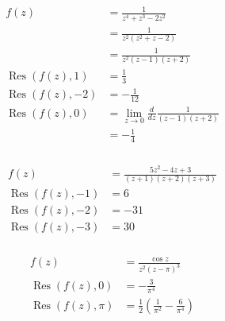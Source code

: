\documentclass{article}
\newcommand{\Res}{\operatorname{Res}}
\begin{document}
\setcounter{subsubsection}{8}
\subsubsection{}

\begin{align*}
  f(z)           & = \frac{1}{z^4 + z^3 - 2 z^2}                                    \\
                 & = \frac{1}{z^2 (z^2 + z - 2)}                                    \\
                 & = \frac{1}{z^2 (z - 1) (z + 2)}                                  \\
  \Res(f(z), 1)  & = \frac{1}{3}                                                    \\
  \Res(f(z), -2) & = -\frac{1}{12}                                                  \\
  \Res(f(z), 0)  & = \lim_{z \rightarrow 0} \frac{d}{d z} \frac{1}{(z - 1) (z + 2)} \\
                 & = -\frac{1}{4}
\end{align*}

\setcounter{subsubsection}{10}
\subsubsection{}

\begin{align*}
  f(z)           & = \frac{5 z^2 - 4 z + 3}{(z + 1) (z + 2) (z + 3)} \\
  \Res(f(z), -1) & = 6                                               \\
  \Res(f(z), -2) & = -31                                             \\
  \Res(f(z), -3) & = 30
\end{align*}

\setcounter{subsubsection}{12}
\subsubsection{}

\begin{align*}
  f(z)            & = \frac{\cos z}{z^2 (z - \pi)^3}                               \\
  \Res(f(z), 0)   & = -\frac{3}{\pi^4}                                             \\
  \Res(f(z), \pi) & = \frac{1}{2} \left( \frac{1}{\pi^2} - \frac{6}{\pi^4} \right)
\end{align*}
\end{document}
